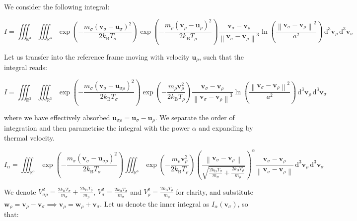 We consider the following integral:

\begin{equation*}
    I=\iiint_{\mathbb{R}^3}\iiint_{\mathbb{R}^3}\exp{\left(-\frac{m_\sigma \left(\mathbf{v}_\sigma-\mathbf{u}_\sigma\right)^2}{2k_\text{B}T_\sigma}\right)}\exp{\left(-\frac{m_\rho \left(\mathbf{v}_\rho-\mathbf{u}_\rho\right)^2}{2k_\text{B}T_\rho}\right)}\frac{\mathbf{v}_\sigma-\mathbf{v}_\rho}{\left\|\mathbf{v}_\sigma-\mathbf{v}_\rho\right\|^3}\ln{\left(\frac{\left\|\mathbf{v}_\sigma-\mathbf{v}_\rho\right\|^2}{a^2}\right)}\,\mathrm{d^3}\mathbf{v}_\rho\,\mathrm{d^3}\mathbf{v}_\sigma
\end{equation*}

Let us transfer into the reference frame moving with velocity $\mathbf{u}_\rho$, such that the integral reads:

\begin{equation*}
    I=\iiint_{\mathbb{R}^3}\iiint_{\mathbb{R}^3}\exp{\left(-\frac{m_\sigma \left(\mathbf{v}_\sigma-\mathbf{u}_{\sigma\rho}\right)^2}{2k_\text{B}T_\sigma}\right)}\exp{\left(-\frac{m_\rho\mathbf{v}_\rho^2}{2k_\text{B}T_\rho}\right)}\frac{\mathbf{v}_\sigma-\mathbf{v}_\rho}{\left\|\mathbf{v}_\sigma-\mathbf{v}_\rho\right\|^3}\ln{\left(\frac{\left\|\mathbf{v}_\sigma-\mathbf{v}_\rho\right\|^2}{a^2}\right)}\,\mathrm{d^3}\mathbf{v}_\rho\,\mathrm{d^3}\mathbf{v}_\sigma
\end{equation*}

where we have effectively absorbed $\mathbf{u}_{\sigma\rho}=\mathbf{u}_\sigma-\mathbf{u}_\rho$. We separate the order of integration and then parametrise the integral with the power $\alpha$ and expanding by thermal velocity.

\begin{equation*}
    I_\alpha=\iiint_{\mathbb{R}^3}\exp{\left(-\frac{m_\sigma \left(\mathbf{v}_\sigma-\mathbf{u}_{\sigma\rho}\right)^2}{2k_\text{B}T_\sigma}\right)}\iiint_{\mathbb{R}^3}\exp{\left(-\frac{m_\rho\mathbf{v}_\rho^2}{2k_\text{B}T_\rho}\right)}\left(\frac{\left\|\mathbf{v}_\sigma-\mathbf{v}_\rho\right\|}{\sqrt{\frac{2k_\text{B}T_\sigma}{m_\sigma}+\frac{2k_\text{B}T_\rho}{m_\rho}}}\right)^{\alpha}\frac{\mathbf{v}_\sigma-\mathbf{v}_\rho}{\left\|\mathbf{v}_\sigma-\mathbf{v}_\rho\right\|}\,\mathrm{d^3}\mathbf{v}_\rho\,\mathrm{d^3}\mathbf{v}_\sigma
\end{equation*}

We denote $V_{\sigma\rho}^2=\frac{2k_\text{B}T_\sigma}{m_\sigma}+\frac{2k_\text{B}T_\rho}{m_\rho}$, $V_\sigma^2=\frac{2k_\text{B}T_\sigma}{m_\sigma}$ and $V_\rho^2=\frac{2k_\text{B}T_\rho}{m_\rho}$ for clarity, and substitute $\mathbf{w}_\rho=\mathbf{v}_\rho-\mathbf{v}_\sigma\implies \mathbf{v}_\rho=\mathbf{w}_\rho+\mathbf{v}_\sigma$. Let us denote the inner integral as $I_\alpha(\mathbf{v}_\sigma)$, so that:


